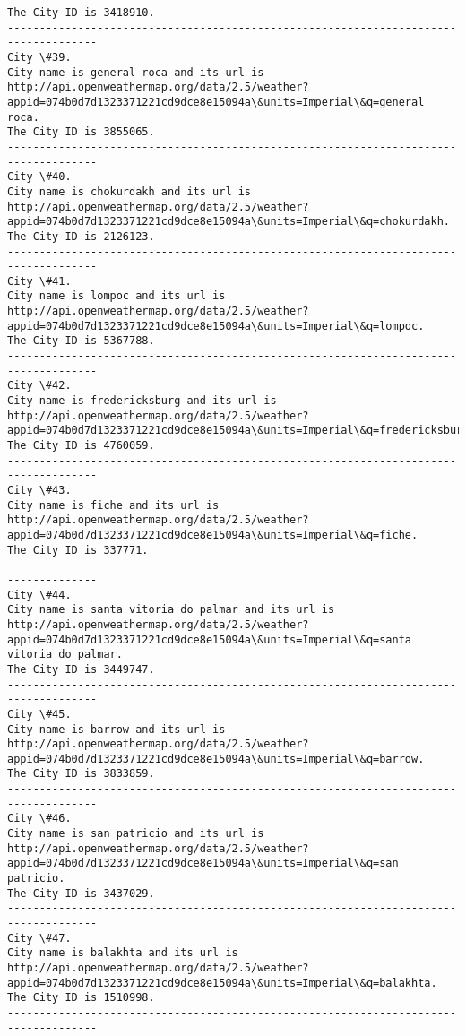 \documentclass[11pt]{article}
\begin{document}
\begin{Verbatim}[commandchars=\\\{\}]
The City ID is 3418910.
------------------------------------------------------------------------------------
City \#39.
City name is general roca and its url is http://api.openweathermap.org/data/2.5/weather?appid=074b0d7d1323371221cd9dce8e15094a\&units=Imperial\&q=general roca.
The City ID is 3855065.
------------------------------------------------------------------------------------
City \#40.
City name is chokurdakh and its url is http://api.openweathermap.org/data/2.5/weather?appid=074b0d7d1323371221cd9dce8e15094a\&units=Imperial\&q=chokurdakh.
The City ID is 2126123.
------------------------------------------------------------------------------------
City \#41.
City name is lompoc and its url is http://api.openweathermap.org/data/2.5/weather?appid=074b0d7d1323371221cd9dce8e15094a\&units=Imperial\&q=lompoc.
The City ID is 5367788.
------------------------------------------------------------------------------------
City \#42.
City name is fredericksburg and its url is http://api.openweathermap.org/data/2.5/weather?appid=074b0d7d1323371221cd9dce8e15094a\&units=Imperial\&q=fredericksburg.
The City ID is 4760059.
------------------------------------------------------------------------------------
City \#43.
City name is fiche and its url is http://api.openweathermap.org/data/2.5/weather?appid=074b0d7d1323371221cd9dce8e15094a\&units=Imperial\&q=fiche.
The City ID is 337771.
------------------------------------------------------------------------------------
City \#44.
City name is santa vitoria do palmar and its url is http://api.openweathermap.org/data/2.5/weather?appid=074b0d7d1323371221cd9dce8e15094a\&units=Imperial\&q=santa vitoria do palmar.
The City ID is 3449747.
------------------------------------------------------------------------------------
City \#45.
City name is barrow and its url is http://api.openweathermap.org/data/2.5/weather?appid=074b0d7d1323371221cd9dce8e15094a\&units=Imperial\&q=barrow.
The City ID is 3833859.
------------------------------------------------------------------------------------
City \#46.
City name is san patricio and its url is http://api.openweathermap.org/data/2.5/weather?appid=074b0d7d1323371221cd9dce8e15094a\&units=Imperial\&q=san patricio.
The City ID is 3437029.
------------------------------------------------------------------------------------
City \#47.
City name is balakhta and its url is http://api.openweathermap.org/data/2.5/weather?appid=074b0d7d1323371221cd9dce8e15094a\&units=Imperial\&q=balakhta.
The City ID is 1510998.
------------------------------------------------------------------------------------

\end{Verbatim}
\end{document}
